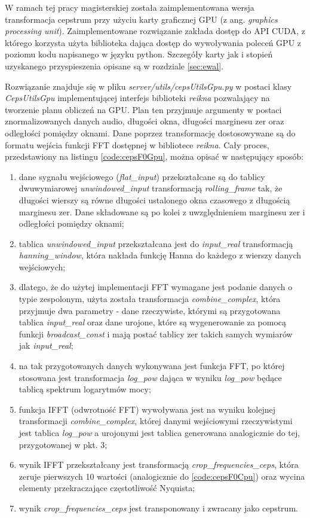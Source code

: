 \documentclass[12pt,a4paper,twoside]{mwart}
\begin{document}
W ramach tej pracy magisterskiej została zaimplementowana wersja transformacja cepstrum przy użyciu karty graficznej GPU (z ang. \textit{graphics processing unit}). Zaimplementowane rozwiązanie zakłada dostęp do API CUDA, z którego korzysta użyta biblioteka dająca dostęp do wywoływania poleceń GPU z poziomu kodu napisanego w języku python. Szczegóły karty jak i stopień uzyskanego przyspieszenia opisane są w rozdziale \ref{sec:ewal}.

Rozwiązanie znajduje się w pliku \textit{server/utils/cepsUtilsGpu.py} w postaci klasy \textit{CepsUtilsGpu} implementującej interfejs biblioteki \textit{reikna} pozwalający na tworzenie planu obliczeń na GPU. Plan ten przyjmuje argumenty w postaci znormalizowanych danych audio, długości okna, długości marginesu zer oraz odległości pomiędzy oknami. Dane poprzez transformację dostosowywane są do formatu wejścia funkcji FFT dostępnej w bibliotece \textit{reikna}. Cały proces, przedstawiony na listingu \ref{code:cepsF0Gpu}, można opisać w następujący sposób:
\begin{enumerate}
  \item dane sygnału wejściowego (\textit{flat\_input}) przekształcane są do tablicy dwuwymiarowej \textit{unwindowed\_input} transformacją \textit{rolling\_frame} tak, że długości wierszy są równe długości ustalonego okna czasowego z długością marginesu zer. Dane składowane są po kolei z uwzględnieniem marginesu zer i odległości pomiędzy oknami;
  \item tablica \textit{unwindowed\_input} przekształcana jest do \textit{input\_real} transformacją \textit{hanning\_window}, która nakłada funkcję Hanna do każdego z wierszy danych wejściowych;
  \item dlatego, że do użytej implementacji FFT wymagane jest podanie danych o typie zespolonym, użyta została transformacja \textit{combine\_complex}, która przyjmuje dwa parametry - dane rzeczywiste, którymi są przygotowana tablica \textit{input\_real} oraz dane urojone, które są wygenerowanie za pomocą funkcji \textit{broadcast\_const} i mają postać tablicy zer takich samych wymiarów jak \textit{input\_real};
  \item na tak przygotowanych danych wykonywana jest funkcja FFT, po której stosowana jest transformacja \textit{log\_pow} dająca w wyniku \textit{log\_pow} będące tablicą spektrum logarytmów mocy;
  \item funkcja IFFT (odwrotność FFT) wywoływana jest na wyniku kolejnej transformacji  \textit{combine\_complex}, której danymi wejściowymi rzeczywistymi jest tablica \textit{log\_pow} a urojonymi jest tablica generowana analogicznie do tej, przygotowanej w pkt. 3;
  \item wynik IFFT przekształcany jest transformacją \textit{crop\_frequencies\_ceps}, która zeruje pierwszych 10 wartości (analogicznie do \ref{code:cepsF0Cpu}) oraz wycina elementy przekraczające częstotliwość Nyquista;
  \item wynik \textit{crop\_frequencies\_ceps} jest transponowany i zwracany jako cepstrum.
\end{enumerate}
\end{document}
